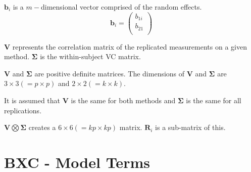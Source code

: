 \documentclass[12pt, a4paper]{report}
\theoremstyle{plain}
\theoremstyle{definition}
\theoremstyle{remark}
\begin{document}
$\boldsymbol{b}_{i}$ is a $m-$dimensional vector comprised of
the random effects.
\begin{equation}
\boldsymbol{b}_{i} = \left( \begin{array}{c}
b_{1i} \\
b_{21}  \\
\end{array}\right)
\end{equation}


$\boldsymbol{V}$ represents the correlation matrix of the replicated measurements on a given method.
$\boldsymbol{\Sigma}$ is the within-subject VC matrix.\\
\bigskip


$\boldsymbol{V}$ and $\boldsymbol{\Sigma}$ are positive
definite matrices. The dimensions of $\boldsymbol{V}$ and
$\boldsymbol{\Sigma}$ are $3 \times 3 ( = p \times p )$ and $ 2 \times
2 (= k \times k)$.\\
\bigskip


It is assumed that $\boldsymbol{V}$ is the same for both methods and $\boldsymbol{\Sigma}$ is
the same for all replications.\\
\bigskip

$\boldsymbol{V} \bigotimes \boldsymbol{\Sigma}$ creates a $ 6 \times 6 ( = kp \times
kp)$ matrix.
$\boldsymbol{R}_{i}$ is a sub-matrix of this.\\
\bigskip



\section{BXC - Model Terms}
\end{document}
